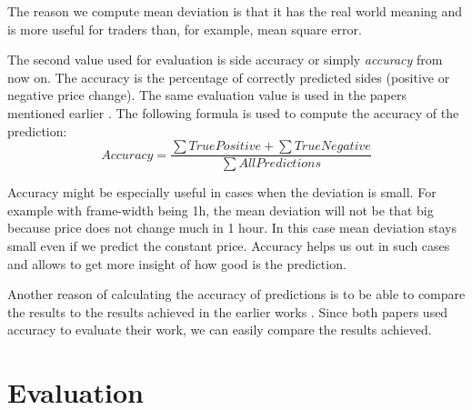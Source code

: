 \documentclass[a4paper,11pt,oneside]{article}
\begin{document}
 The reason we compute mean deviation is that it has the real world meaning and is more useful for traders than, for example, mean square error. 
 
 The second value used for evaluation is side accuracy or simply {\it accuracy} from now on. The accuracy is the percentage of correctly predicted sides (positive or negative price change). The same evaluation value is used in the papers mentioned earlier \cite{related1} \cite{related2}. The following formula is used to compute the accuracy of the prediction:
 \begin{equation}\label{accuracy}
 	Accuracy = \frac{\sum True Positive + \sum True Negative}{\sum All Predictions}
 \end{equation}
 
 Accuracy might be especially useful in cases when the deviation is small. For example with frame-width being 1h, the mean deviation will not be that big because price does not change much in 1 hour. In this case mean deviation stays small even if we predict the constant price. Accuracy helps us out in such cases and allows to get more insight of how good is the prediction.
 
 Another reason of calculating the accuracy of predictions is to be able to compare the results to the results achieved in the earlier works \cite{related1} \cite{related2}. Since both papers used accuracy to evaluate their work, we can easily compare the results achieved.

  \section{Evaluation}
\end{document}
